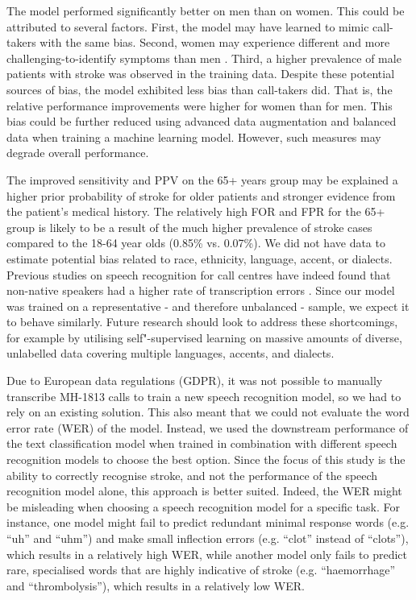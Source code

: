 {The model performed significantly better on men than on women. This could be attributed to several factors. First, the model may have learned to mimic call-takers with the same bias. Second, women may experience different and more challenging-to-identify symptoms than men \parencite{cite29,cite30}. Third, a higher prevalence of male patients with stroke was observed in the training data. Despite these potential sources of bias, the model exhibited less bias than call-takers did. That is, the relative performance improvements were higher for women than for men. This bias could be further reduced using advanced data augmentation and balanced data when training a machine learning model. However, such measures may degrade overall performance.

The improved sensitivity and PPV on the 65+ years group may be explained a higher prior probability of stroke for older patients and stronger evidence from the patient's medical history. The relatively high FOR and FPR for the 65+ group is likely to be a result of the much higher prevalence of stroke cases compared to the 18-64 year olds (0.85\% vs. 0.07\%). We did not have data to estimate potential bias related to race, ethnicity, language, accent, or dialects. Previous studies on speech recognition for call centres have indeed found that non-native speakers had a higher rate of transcription errors \parencite{han_deep_2017}. Since our model was trained on a representative - and therefore unbalanced - sample, we expect it to behave similarly. Future research should look to address these shortcomings, for example by utilising self"-supervised learning on massive amounts of diverse, unlabelled data covering multiple languages, accents, and dialects.

Due to European data regulations (GDPR), it was not possible to manually transcribe MH-1813 calls to train a new speech recognition model, so we had to rely on an existing solution. This also meant that we could not evaluate the word error rate (WER) of the model. Instead, we used the downstream performance of the text classification model when trained in combination with different speech recognition models to choose the best option. Since the focus of this study is the ability to correctly recognise stroke, and not the performance of the speech recognition model alone, this approach is better suited. Indeed, the WER might be misleading when choosing a speech recognition model for a specific task. For instance, one model might fail to predict redundant minimal response words (e.g. “uh” and “uhm”) and make small inflection errors (e.g. “clot” instead of “clots”), which results in a relatively high WER, while another model only fails to predict rare, specialised words that are highly indicative of stroke (e.g. “haemorrhage” and “thrombolysis”), which results in a relatively low WER.

}
